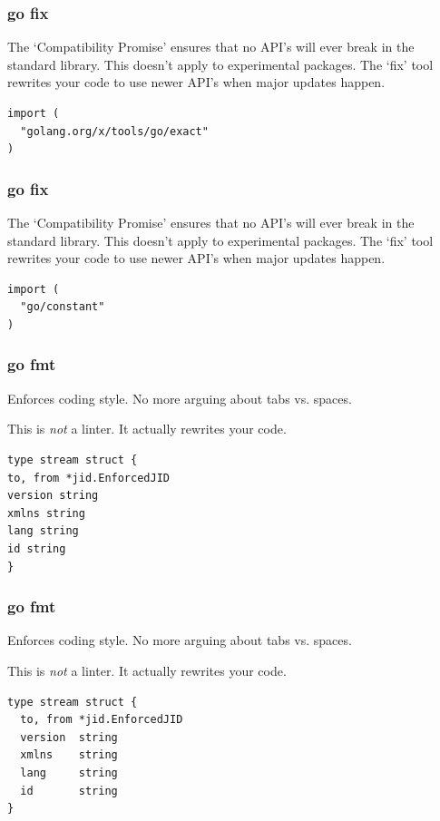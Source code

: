 \documentclass[xelatex,aspectratio=169]{beamer}
\begin{document}
\begin{frame}[fragile]
	\frametitle{go fix}
	\begin{flushleft}
		The `Compatibility Promise' ensures that no API's will ever break in the
		standard library. This doesn't apply to experimental packages. The `fix'
		tool rewrites your code to use newer API's when major updates happen.
	\end{flushleft}
\begin{verbatim}
import (
  "golang.org/x/tools/go/exact"
)
\end{verbatim}
\end{frame}

\begin{frame}[fragile]
	\frametitle{go fix}
	\begin{flushleft}
		The `Compatibility Promise' ensures that no API's will ever break in the
		standard library. This doesn't apply to experimental packages. The `fix'
		tool rewrites your code to use newer API's when major updates happen.
	\end{flushleft}
\begin{verbatim}
import (
  "go/constant"
)
\end{verbatim}
\end{frame}

\begin{frame}[fragile]
	\frametitle{go fmt}
	\begin{flushleft}
		Enforces coding style. No more arguing about tabs vs. spaces.
	\end{flushleft}
	\begin{flushleft}
		This is \emph{not} a linter. It actually rewrites your code.
	\end{flushleft}
\begin{verbatim}
type stream struct {
to, from *jid.EnforcedJID
version string
xmlns string
lang string
id string
}
\end{verbatim}
\end{frame}
\begin{frame}[fragile]
	\frametitle{go fmt}
	\begin{flushleft}
		Enforces coding style. No more arguing about tabs vs. spaces.
	\end{flushleft}
	\begin{flushleft}
		This is \emph{not} a linter. It actually rewrites your code.
	\end{flushleft}
\begin{verbatim}
type stream struct {
  to, from *jid.EnforcedJID
  version  string
  xmlns    string
  lang     string
  id       string
}
\end{verbatim}
\end{frame}
\end{document}
